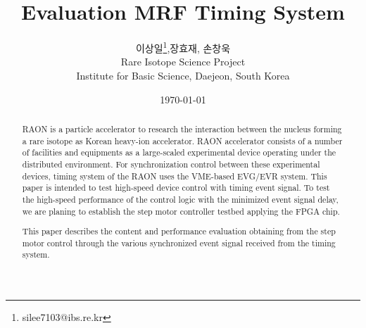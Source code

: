 \documentclass[11pt
-  , a4paper
  , article
  , oneside
]{memoir}
\begin{document}
\newcommand{\technumber}{
  RAON Control-Document Series\\
  Revision : v1.0,   Release : 2015-10-12 fixed date}
\title{\textbf{Evaluation MRF Timing System}}

\author{이상일\thanks{silee7103@ibs.re.kr},장효재, 손창욱\\

  Rare Isotope Science Project\\
  Institute for Basic Science, Daejeon, South Korea
}
\date{\today}

\renewcommand{\maketitlehooka}{\begin{flushright}\textsf{\technumber}\end{flushright}}

\maketitle

\begin{abstract}
RAON is a particle accelerator to research the interaction between the nucleus forming a rare isotope as Korean heavy-ion accelerator. RAON accelerator consists of a number of facilities and equipments as a large-scaled experimental device operating under the distributed environment. For synchronization control between these experimental devices, timing system of the RAON uses the VME-based EVG/EVR system. This paper is intended to test high-speed device control with timing event signal. To test the high-speed performance of the control logic with the minimized event signal delay, we are planing to establish the step motor controller testbed applying the FPGA chip. 

This paper describes the content and performance evaluation obtaining from the step motor control through the various synchronized event signal received from the timing system.
\end{abstract}
\end{document}
